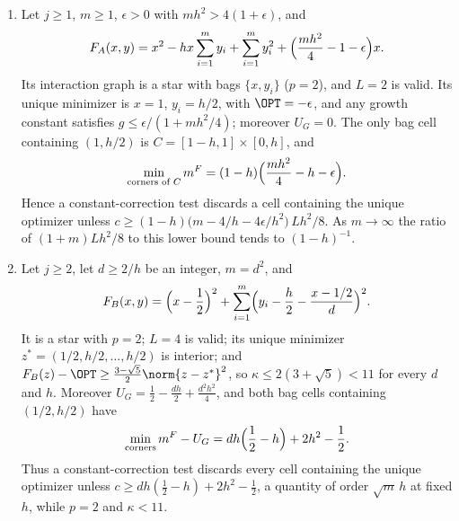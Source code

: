 \begin{proposition}\label{prop:cr-star}
\leavevmode
\begin{enumerate}
\item[(A)] Let $j\ge1$, $m\ge1$, $\epsilon>0$ with $mh^2>4(1+\epsilon)$, and
\[
F_A(x,y)=x^2-hx\sum_{i=1}^my_i+\sum_{i=1}^my_i^2
+\Bigl(\frac{mh^2}4-1-\epsilon\Bigr)x .
\]
Its interaction graph is a star with bags $\{x,y_i\}$ ($p=2$), and $L=2$
is valid. Its unique minimizer is $x=1$, $y_i=h/2$, with $\OPT=-\epsilon$,
and any growth constant satisfies $g\le\epsilon/(1+mh^2/4)$; moreover
$U_G=0$. The only bag cell containing $(1,h/2)$ is
$C=[1-h,1]\times[0,h]$, and
\[
\min_{\text{corners of }C}m^F=(1-h)\Bigl(\frac{mh^2}4-h-\epsilon\Bigr).
\]
Hence a constant-correction test discards a cell containing the unique
optimizer unless
$c\ge(1-h)\bigl(m-4/h-4\epsilon/h^2\bigr)\,Lh^2/8$. As $m\to\infty$ the
ratio of $(1+m)Lh^2/8$ to this lower bound tends to $(1-h)^{-1}$.
\item[(B)] Let $j\ge2$, let $d\ge2/h$ be an integer, $m=d^2$, and
\[
F_B(x,y)=\Bigl(x-\frac12\Bigr)^2+\sum_{i=1}^m
\Bigl(y_i-\frac h2-\frac{x-1/2}{d}\Bigr)^2 .
\]
It is a star with $p=2$; $L=4$ is valid; its unique minimizer
$z^*=(1/2,h/2,\ldots,h/2)$ is interior; and
$F_B(z)-\OPT\ge\frac{3-\sqrt5}2\norm{z-z^*}^2$, so
$\kappa\le2(3+\sqrt5)<11$ for every $d$ and $h$. Moreover
$U_G=\frac12-\frac{dh}2+\frac{d^2h^2}4$, and both bag cells containing
$(1/2,h/2)$ have
\[
\min_{\text{corners}}m^F-U_G=dh\Bigl(\frac12-h\Bigr)+2h^2-\frac12 .
\]
Thus a constant-correction test discards every cell containing the
unique optimizer unless $c\ge dh(\frac12-h)+2h^2-\frac12$, a quantity of
order $\sqrt m\,h$ at fixed $h$, while $p=2$ and $\kappa<11$.
\end{enumerate}
\end{proposition}
